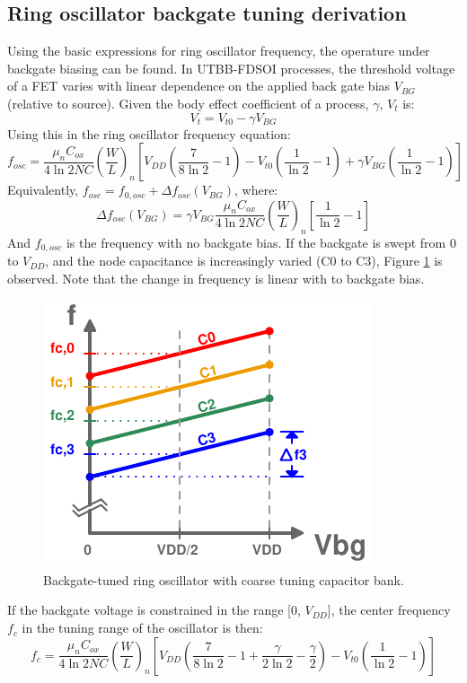 	\subsection{Ring oscillator backgate tuning derivation}
		Using the basic expressions for ring oscillator frequency, the operature under backgate biasing can be found. In UTBB-FDSOI processes, the threshold voltage of a FET varies with linear dependence on the applied back gate bias $V_{BG}$ (relative to source). Given the body effect coefficient of a process, $\gamma$, $V_t$ is:
		\begin{equation}
			V_t = V_{t0} - \gamma V_{BG}
		\end{equation}
		Using this in the ring oscillator frequency equation:
		\begin{equation}
			f_{osc} = \frac{\mu_nC_{ox}}{4\ln2NC}\left(\frac{W}{L}\right)_n\left[V_{DD}\left(\frac{7}{8\ln2}-1\right)-V_{t0}\left(\frac{1}{\ln2}-1\right) + \gamma V_{BG}\left(\frac{1}{\ln2}-1\right) \right]
		\end{equation}
		Equivalently, $f_{osc} = f_{0,osc} + \Delta f_{osc}(V_{BG})$, where:
		\begin{equation}
			\Delta f_{osc}(V_{BG}) = \gamma V_{BG}\frac{\mu_nC_{ox}}{4\ln2NC}\left(\frac{W}{L}\right)_n\left[\frac{1}{\ln2}-1\right]
		\end{equation}	
		And $f_{0,osc}$ is the frequency with no backgate bias. If the backgate is swept from 0 to $V_{DD}$, and the node capacitance is increasingly varied (C0 to C3), Figure \ref{fig:rosc_tuning} is observed. Note that the change in frequency is linear with to backgate bias.
		\FloatBarrier
		\begin{figure}[htb!]
			\center\includegraphics[width=0.3\linewidth, angle=0]{figs/backgate_rosc_tuning2.pdf}
			\caption{Backgate-tuned ring oscillator with coarse tuning capacitor bank.}
			\label{fig:rosc_tuning}
		\end{figure}
		If the backgate voltage is constrained in the range [0, $V_{DD}$], the center frequency $f_c$ in the tuning range of the oscillator is then:
		\begin{equation}
			f_{c} = \frac{\mu_nC_{ox}}{4\ln2NC}\left(\frac{W}{L}\right)_n\left[V_{DD}\left(\frac{7}{8\ln2}-1+\frac{\gamma}{2\ln2}-\frac{\gamma}{2}\right)-V_{t0}\left(\frac{1}{\ln2}-1\right)\right]
		\end{equation}
